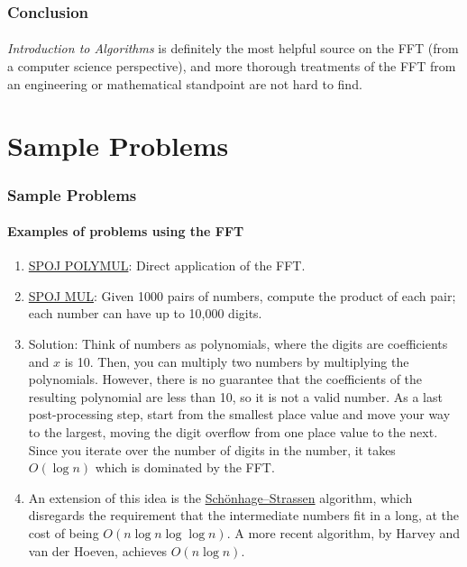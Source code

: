 \documentclass{beamer}                             %
\begin{document}
\begin{frame}
\frametitle{Conclusion}
\framesubtitle{}
\textit{Introduction to Algorithms} is definitely the most helpful source on
the FFT (from a computer science perspective), and more thorough treatments of
the FFT from an engineering or mathematical standpoint are not hard to find.
\end{frame}

\section{Sample Problems}
\begin{frame}
\frametitle{Sample Problems}
\framesubtitle{Examples of problems using the FFT}
\begin{enumerate}
  \item \href{https://www.spoj.com/problems/POLYMUL/}{SPOJ POLYMUL}:
    Direct application of the FFT.

  \item \href{https://www.spoj.com/problems/MUL/}{SPOJ MUL}:
    Given 1000 pairs of numbers, compute the product of each pair;
    each number can have up to 10,000 digits.
    \addtocounter{enumi}{-1}
  \item Solution: Think of numbers as polynomials,
    where the digits are coefficients and \( x \) is 10.
    Then, you can multiply two numbers by multiplying the polynomials.
    However, there is no guarantee that the coefficients
    of the resulting polynomial are less than 10, so it is not a valid number.
    As a last post-processing step, start from the smallest place value
    and move your way to the largest, moving the digit overflow from one place
    value to the next. Since you iterate over the number of digits in the
    number, it takes \( O(\log n) \) which is dominated by the FFT.  
    \addtocounter{enumi}{-1}
  \item An extension of this idea is the 
    \href{https://en.wikipedia.org/wiki/Sch\%C3\%B6nhage\%E2\%80\%93Strassen_algorithm}
    {Schönhage–Strassen} algorithm, which disregards the requirement
    that the intermediate numbers fit in a long, at the cost of being
    \( O(n \log n \log \log n) \). A more recent algorithm,
    by Harvey and van der Hoeven, achieves 
    \href{https://hal.archives-ouvertes.fr/hal-02070778/document}{\( O(n \log n) \)}.


\end{enumerate}
\end{frame}
\end{document}
